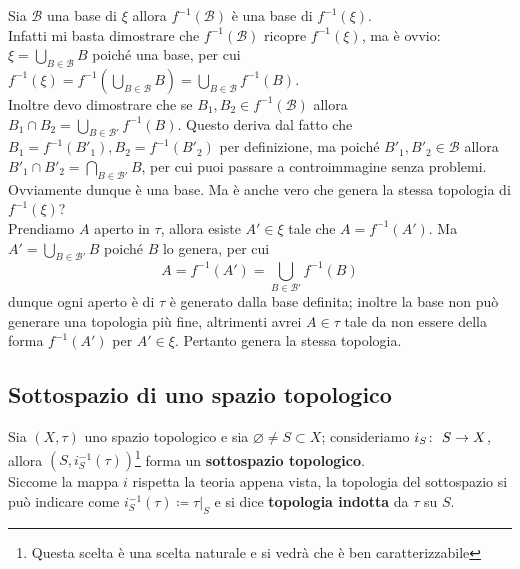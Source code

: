 \begin{remark}
	\label{remark:induced_bases_by_a_map}
	Sia $\mathcal{B}$ una base di $\xi$ allora $f^{-1}(\mathcal{B})$ è una base di $f^{-1}(\xi)$. \\ Infatti mi basta dimostrare che $f^{-1}(\mathcal{B})$ ricopre $f^{-1}(\xi)$, ma è ovvio: $\xi = \bigcup_{B \in \mathcal{B}} B$ poiché una base, per cui $f^{-1}(\xi) = f^{-1}(\bigcup_{B \in \mathcal{B}} B) = \bigcup_{B \in \mathcal{B}} f^{-1}(B)$. \\ Inoltre devo dimostrare che se $B_1, B_2 \in f^{-1}(\mathcal{B})$ allora $B_1 \cap B_2 = \bigcup_{B \in \mathcal{B}'}f^{-1}(B)$. Questo deriva dal fatto che $B_1 = f^{-1}(B'_1), B_2 = f^{-1}(B'_2)$ per definizione, ma poiché $B'_1, B'_2 \in \mathcal{B}$ allora $B'_1 \cap B'_2 = \bigcap_{B \in \mathcal{B}'} B$, per cui puoi passare a controimmagine senza problemi. \\
	
	Ovviamente dunque è una base. Ma è anche vero che genera la stessa topologia di $f^{-1}(\xi)$? \\ Prendiamo $A$ aperto in $\tau$, allora esiste $A' \in \xi$ tale che $A = f^{-1}(A')$. Ma $A' = \bigcup_{B \in \mathcal{B}'} B$ poiché $B$ lo genera, per cui
	\begin{equation*}
		A = f^{-1}(A') = \bigcup_{B \in \mathcal{B}'} f^{-1}(B) 
	\end{equation*}
	dunque ogni aperto è di $\tau$ è generato dalla base definita; inoltre la base non può generare una topologia più fine, altrimenti avrei $A \in \tau$ tale da non essere della forma $f^{-1}(A')$ per $A' \in \xi$. Pertanto genera la stessa topologia.
\end{remark}

\subsection{Sottospazio di uno spazio topologico}

\begin{definition}
	Sia $(X,\tau)$ uno spazio topologico e sia $\varnothing \neq S \subset X$; consideriamo $i_S \colon\ S \rightarrow X$, allora $(S, i^{-1}_S(\tau))$\footnote{Questa scelta è una scelta naturale e si vedrà che è ben caratterizzabile} forma un \textbf{sottospazio topologico}.\\ Siccome la mappa $i$ rispetta la teoria appena vista, la topologia del sottospazio si può indicare come $i^{-1}_S(\tau) \coloneqq \tau|_S$ e si dice \textbf{topologia indotta} da $\tau$ su $S$.
\end{definition}

